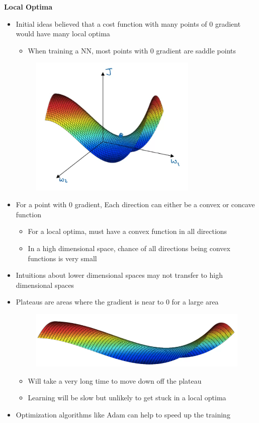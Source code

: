 \documentclass[12pt, letterpaper]{article}
\begin{document}
    \vspace{5mm}
    \textbf{Local Optima}
    \begin{itemize}
        \item Initial ideas believed that a cost function with many points of 0 gradient would have many local optima
        \begin{itemize}
            \item When training a NN, most points with 0 gradient are saddle points
        \end{itemize}
        \begin{figure}[ht]
            \centering
            \includegraphics[width=8cm]{21.png}
        \end{figure}
        \item For a point with 0 gradient, Each direction can either be a convex or concave function
        \begin{itemize}
            \item For a local optima, must have a convex function in all directions
            \item In a high dimensional space, chance of all directions being convex functions is very small
        \end{itemize}
        \item Intuitions about lower dimensional spaces may not transfer to high dimensional spaces
        \item Plateaus are areas where the gradient is near to 0 for a large area
        \begin{figure}[ht]
            \centering 
            \includegraphics[width=12cm]{22.png}
        \end{figure}
        \begin{itemize}
            \item Will take a very long time to move down off the plateau
            \item Learning will be slow but unlikely to get stuck in a local optima
        \end{itemize}
        \item Optimization algorithms like Adam can help to speed up the training
    \end{itemize}
\end{document}
